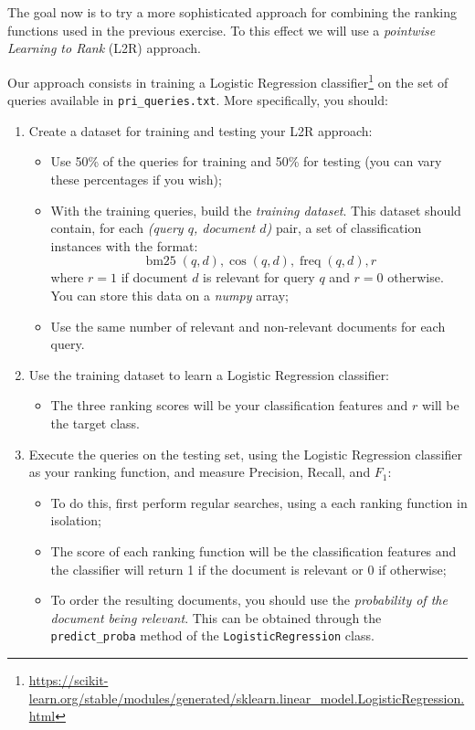 \documentclass[12pt]{article}
\begin{document}
\section{}

The goal now is to try a more sophisticated approach for combining the ranking functions used in the previous exercise. To this effect we will use a \emph{pointwise Learning to Rank} (L2R) approach.

Our approach consists in training a Logistic Regression classifier\footnote{\url{https://scikit-learn.org/stable/modules/generated/sklearn.linear_model.LogisticRegression.html}} on the set of queries available in \texttt{pri\_queries.txt}. More specifically, you should:
\begin{enumerate}
\item Create a dataset for training and testing your L2R approach:
    \begin{itemize}
    \item Use 50\% of the queries for training and 50\% for testing (you can vary these percentages if you wish);
    \item With the training queries, build the \emph{training dataset}. This dataset should contain, for each \textit{(query $q$, document $d$)} pair, a set of classification instances with the format:
        \begin{displaymath}
            \operatorname{bm25}(q,d), \operatorname{cos}(q,d), \operatorname{freq}(q,d), r
        \end{displaymath}
        where $r = 1$ if document $d$ is relevant for query $q$ and $r=0$ otherwise. You can store this data on a \textit{numpy} array;
    \item Use the same number of relevant and non-relevant documents for each query.
    \end{itemize}
\item Use the training dataset to learn a Logistic Regression classifier:
    \begin{itemize}
    \item The three ranking scores will be your classification features and $r$ will be the target class.
    \end{itemize}
\item Execute the queries on the testing set, using the Logistic Regression classifier as your ranking function, and measure Precision, Recall, and $F_1$:
    \begin{itemize}
    \item To do this, first perform regular searches, using a each ranking function in isolation;
    \item The score of each ranking function will be the classification features and the classifier will return 1 if the document is relevant or 0 if otherwise;
    \item To order the resulting documents, you should use the \emph{probability of the document being relevant}. This can be obtained through the \texttt{predict\_proba} method of the \texttt{LogisticRegression} class.
    \end{itemize}
\end{enumerate}
\end{document}
